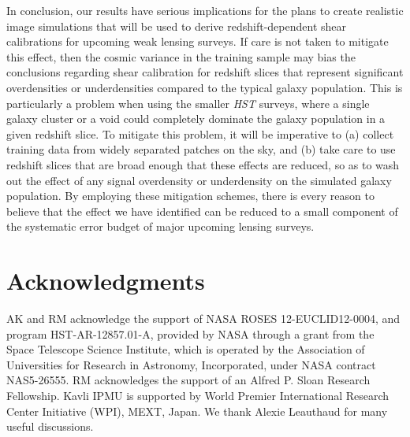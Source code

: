 \documentclass[twocolumn,useAMS,usenatbib]{mn2e}
\newcommand{\rachel}[1]{{\textcolor{red}{#1}}}
\newcommand{\arun}[1]{{\textcolor{blue}{#1}}}
\newcommand{\claire}[1]{{\textcolor{magenta}{#1}}}
\begin{document}
In conclusion, our results have serious implications for the plans to
create realistic image simulations that will be used to derive
redshift-dependent shear calibrations for upcoming weak lensing
surveys.  If care is not taken to mitigate this effect, then the
cosmic variance in the training sample may bias the conclusions
regarding shear calibration for redshift slices that represent
significant overdensities or underdensities compared to the typical
galaxy population.  This is particularly a problem when using the
smaller {\em HST} surveys, where a single galaxy cluster or a void
could completely dominate the galaxy population in a given redshift
slice.  To mitigate this problem, it will be imperative to (a) collect
training data from widely separated patches on the sky, and (b) take
care to use redshift slices that are broad enough that these effects
are reduced, so as to wash out the effect of any signal overdensity or
underdensity on the simulated galaxy population.  By employing these
mitigation schemes, there is every reason to believe that the effect
we have identified can be reduced to a small component of the
systematic error budget of major upcoming lensing surveys.


\section*{Acknowledgments}

AK and RM acknowledge the support of NASA ROSES 12-EUCLID12-0004, and
program HST-AR-12857.01-A, provided by NASA through a grant from the
Space Telescope Science Institute, which is operated by the
Association of Universities for Research in Astronomy, Incorporated,
under NASA contract NAS5-26555. RM acknowledges the support of an Alfred P. Sloan Research Fellowship. 
Kavli IPMU is supported by World Premier International Research Center Initiative (WPI), MEXT, Japan.
We thank Alexie Leauthaud for 
many useful discussions.




\end{document}
